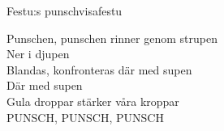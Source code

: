 \begin{song}{Festu:s punschvisa}{festu}
\begin{vers}
Punschen, punschen rinner genom strupen\\
Ner i djupen\\
Blandas, konfronteras där med supen\\
Där med supen\\
Gula droppar stärker våra kroppar\\
PUNSCH, PUNSCH, PUNSCH\\
\end{vers}
\end{song}
